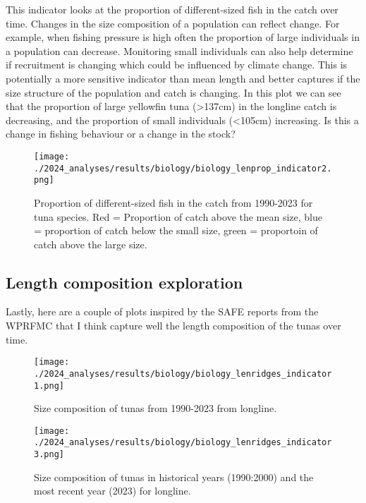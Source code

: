 \documentclass[
]{article}
\begin{document}
This indicator looks at the proportion of different-sized fish in the
catch over time. Changes in the size composition of a population can
reflect change. For example, when fishing pressure is high often the
proportion of large individuals in a population can decrease. Monitoring
small individuals can also help determine if recruitment is changing
which could be influenced by climate change. This is potentially a more
sensitive indicator than mean length and better captures if the size
structure of the population and catch is changing. In this plot we can
see that the proportion of large yellowfin tuna (\textgreater137cm) in
the longline catch is decreasing, and the proportion of small
individuals (\textless105cm) increasing. Is this a change in fishing
behaviour or a change in the stock?

\begin{figure}
\centering
\texttt{[image: ./2024\_analyses/results/biology/biology\_lenprop\_indicator2.png]}
\caption{Proportion of different-sized fish in the catch from 1990-2023
for tuna species. Red = Proportion of catch above the mean size, blue =
proportion of catch below the small size, green = proportoin of catch
above the large size.}
\end{figure}

\clearpage

\hypertarget{length-composition-exploration}{%
\subsection{Length composition
exploration}\label{length-composition-exploration}}

Lastly, here are a couple of plots inspired by the SAFE reports from the
WPRFMC that I think capture well the length composition of the tunas
over time.

\begin{figure}
\centering
\texttt{[image: ./2024\_analyses/results/biology/biology\_lenridges\_indicator1.png]}
\caption{Size composition of tunas from 1990-2023 from longline.}
\end{figure}

\begin{figure}
\centering
\texttt{[image: ./2024\_analyses/results/biology/biology\_lenridges\_indicator3.png]}
\caption{Size composition of tunas in historical years (1990:2000) and
the most recent year (2023) for longline.}
\end{figure}
\end{document}
